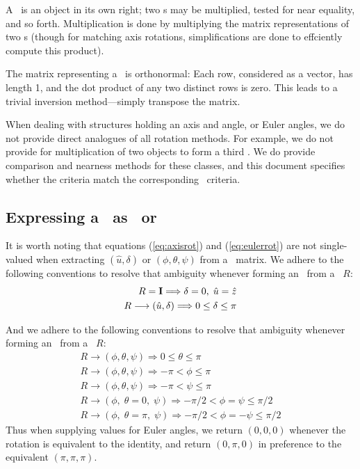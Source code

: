 A \Ro\ is an object in its own right; two \Ro s may be multiplied,
tested for near equality, and so forth.
Multiplication is done by multiplying the matrix representations of two
\Ro s (though for matching axis rotations, simplifications are
done to effciently compute this product).

The matrix representing a \Ro\ is orthonormal:  Each row, considered
as a vector, has length 1, and the dot product of any two distinct rows
is zero.  This leads to a trivial inversion method---simply transpose the
matrix.

When dealing with structures holding an axis and angle, or Euler angles,
we do not provide direct analogues of all rotation methods.  For example,
we do not provide for multiplication of two \Ax objects to form a third
\Ax.  We do provide comparison and nearness methods for these classes,
and this document specifies whether the criteria match the corresponding
\Rotation\ criteria.

\subsection{Expressing a \protect\Ro\ as \protect\Ax\ or \protect\Es\ }

It is worth noting that equations (\ref{eq:axisrot}) and (\ref{eq:eulerrot})
are not single-valued when extracting $ ( \hat{u}, \delta) $ or
$ ( \phi, \theta, \psi ) $ from a \Rotation\ matrix.  We adhere to the
following conventions to resolve that ambiguity whenever forming an
\Ax\ from a \Rotation\ $R$:
\begin{eqnarray}
  R = {\bf I} \Longrightarrow \delta = 0, \; \hat{u} = \hat{z}
	\\
	\label{eq:deltaconv}
  R \longrightarrow ( \hat{u}, \delta ) \Longrightarrow 0 \leq \delta \leq \pi
\end{eqnarray}

And we adhere to the
following conventions to resolve that ambiguity whenever forming an
\Es\ from a \Rotation\ $R$:
\begin{eqnarray}
 \label{eq:thetaconv}
  R \longrightarrow ( \phi, \theta, \psi )
	\Longrightarrow 0 \leq \theta \leq \pi
	\\
 \label{eq:tphiconv}
  R \longrightarrow ( \phi, \theta, \psi )
	\Longrightarrow -\pi < \phi \leq \pi
	\\
 \label{eq:psiconv}
  R \longrightarrow ( \phi, \theta, \psi )
	\Longrightarrow -\pi < \psi \leq \pi
	\\
 \label{eq:phipsiconv}
  R \longrightarrow ( \phi, \; \theta = 0, \; \psi )
	\Longrightarrow -\pi/2 < \phi = \psi \leq \pi/2
	\\
  R \longrightarrow ( \phi, \; \theta = \pi, \; \psi )
	\Longrightarrow -\pi/2 < \phi = -\psi \leq \pi/2
\end{eqnarray}
\noindent
Thus when supplying values for Euler angles,
we return $(0, 0, 0)$ whenever the rotation is
equivalent to the identity, and return $(0, \pi, 0)$ in preference to
the equivalent $(\pi, \pi, \pi)$.

